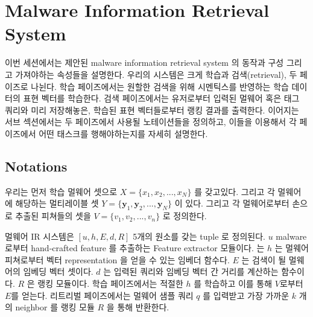 \section{Malware Information Retrieval System}
이번 세션에서는 제안된 malware information retrieval system 의 동작과 구성 그리고 가져야하는 속성들을 설명한다. 우리의 시스템은 크게 학습과 검색(retrieval), 두 페이즈로 나뉜다. 학습 페이즈에서는 원할한 검색을 위해 시멘틱스를 반영하는 학습 데이터의 표현 벡터를 학습한다. 검색 페이즈에서는 유저로부터 입력된 멀웨어 혹은 태그 쿼리와 미리 저장해놓은, 학습된 표현 벡터들로부터 랭킹 결과를 출력한다. 이어지는 서브 섹션에서는 두 페이즈에서 사용될 노테이션들을 정의하고, 이들을 이용해서 각 페이즈에서 어떤 태스크를 행해야하는지를 자세히 설명한다.  


\subsection{Notations}
우리는 먼저 학습 멀웨어 셋으로 $X = \{x_1, x_2, ..., x_N\}$ 를 갖고있다. 그리고 각 멀웨어에 해당하는 멀티레이블 셋 $Y = \{\mathbf{y}_{1}, \mathbf{y}_{2}, ... , \mathbf{y}_{N}\}$ 이 있다.  그리고 각 멀웨어로부터 손으로 추출된 피쳐들의 셋을 $V = \{v_1, v_2, ..., v_n \}$ 로 정의한다.

멀웨어 IR 시스템은 $[u, h, E, d, R]$ 5개의 원소를 갖는 tuple 로 정의된다. $u$ malware 로부터 hand-crafted feature 를 추출하는 Feature extractor 모듈이다. 는 $h$ 는 멀웨어 피쳐로부터 벡터 representation 을 얻을 수 있는 임베더 함수다. $E$ 는 검색이 될 멀웨어의 임베딩 벡터 셋이다. $d$ 는 입력된 쿼리와 임베딩 벡터 간 거리를 계산하는 함수이다. $R$ 은 랭킹 모듈이다. 학습 페이즈에서는 적절한 $h$ 를 학습하고 이를 통해 $V$로부터 $E$를 얻는다. 리트리벌 페이즈에서는 멀웨어 샘플 쿼리 $q$ 를 입력받고 가장 가까운 $k$ 개의 neighbor 를 랭킹 모듈 $R$ 을 통해 반환한다.

